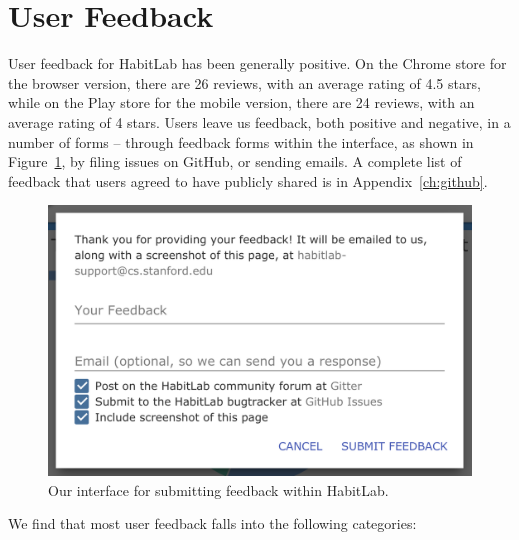 
\section{User Feedback}

 

User feedback for HabitLab has been generally positive. On the Chrome store for the browser version, there are 26 reviews, with an average rating of 4.5 stars, while on the Play store for the mobile version, there are 24 reviews, with an average rating of 4 stars. Users leave us feedback, both positive and negative, in a number of forms -- through feedback forms within the interface, as shown in Figure~\ref{fig:feedback_form}, by filing issues on GitHub, or sending emails. A complete list of feedback that users agreed to have publicly shared is in Appendix~\ref{ch:github}.

\begin{figure}
\includegraphics[width=\linewidth]{figuresS/feedback_form}
\caption{Our interface for submitting feedback within HabitLab.}
  \label{fig:feedback_form}
\end{figure}


We find that most user feedback falls into the following categories:

